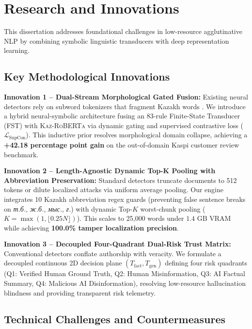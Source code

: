 \section{Research and Innovations}
\label{sec:innovations_and_challenges}

This dissertation addresses foundational challenges in low-resource agglutinative NLP by combining symbolic linguistic transducers with deep representation learning.

\subsection{Key Methodological Innovations}
\label{sec:innovations}

\noindent\textbf{Innovation 1 -- Dual-Stream Morphological Gated Fusion:}
Existing neural detectors rely on subword tokenizers that fragment Kazakh words \cite{khurana2024subwords}. We introduce a hybrid neural-symbolic architecture fusing an 83-rule Finite-State Transducer (FST) with \textsc{Kaz-RoBERTa} via dynamic gating and supervised contrastive loss ($\mathcal{L}_{\text{SupCon}}$). This inductive prior resolves morphological domain collapse, achieving a \textbf{+42.18 percentage point gain} on the out-of-domain Kaspi customer review benchmark.

\vspace{0.1cm}
\noindent\textbf{Innovation 2 -- Length-Agnostic Dynamic Top-K Pooling with Abbreviation Preservation:}
Standard detectors truncate documents to 512 tokens or dilute localized attacks via uniform average pooling. Our engine integrates 10 Kazakh abbreviation regex guards (preventing false sentence breaks on \textit{т.б.}, \textit{ж.б.}, \textit{мыс.}, \textit{ғ.}) with dynamic Top-$K$ worst-chunk pooling ($K = \max(1, \lfloor 0.25 N \rfloor)$). This scales to 25,000 words under $1.4\text{ GB}$ VRAM while achieving \textbf{100.0\% tamper localization precision}.

\vspace{0.1cm}
\noindent\textbf{Innovation 3 -- Decoupled Four-Quadrant Dual-Risk Trust Matrix:}
Conventional detectors conflate authorship with veracity. We formulate a decoupled continuous 2D decision plane $(T_{\text{fact}}, T_{\text{gen}})$ defining four risk quadrants (Q1: Verified Human Ground Truth, Q2: Human Misinformation, Q3: AI Factual Summary, Q4: Malicious AI Disinformation), resolving low-resource hallucination blindness and providing transparent risk telemetry.

\subsection{Technical Challenges and Countermeasures}
\label{sec:challenges}

